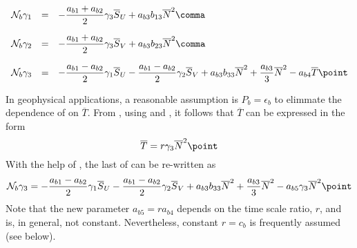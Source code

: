 \begin{equation}
 \label{giVertical}
 \begin{array}{rcl}
  {\cal N}_b \gamma_1
  &=&
  - \dfrac{a_{b1} + a_{b2}}{2}           \gamma_3 \overline{S}_U
  +      a_{b3}                           b_{13}  \overline{N}^2                  
  \comma \\[5mm] 
  {\cal N}_b \gamma_2
  &=&
  - \dfrac{a_{b1} + a_{b2}}{2}           \gamma_3 \overline{S}_V
  +      a_{b3}                           b_{23}  \overline{N}^2                  
  \comma \\[5mm] 
  {\cal N}_b \gamma_3
  &=&
  - \dfrac{a_{b1} - a_{b2}}{2}           \gamma_1 \overline{S}_U
  - \dfrac{a_{b1} - a_{b2}}{2}           \gamma_2 \overline{S}_V
  +         a_{b3}                         b_{33} \overline{N}^2                              
  + \dfrac{a_{b3}}{3}                             \overline{N}^2                              
  -         a_{b4}                                \overline{T}                          
 \point
 \end{array}
\end{equation}

In geophysical applications, a reasonable assumption is
$P_b=\epsilon_b$ to elimmate the dependence of  on
$\overline{T}$. From , using
 and , it follows that $\overline{T}$ can be
expressed in the form
\begin{equation}
 \label{Tequilibrium}
   \overline{T} = r \gamma_3 \overline{N}^2
 \point
\end{equation}
With the help of , the last of  can be
re-written as
\begin{equation}
 \label{giVerticalEq}
  {\cal N}_b \gamma_3
  =
  - \dfrac{a_{b1} - a_{b2}}{2}             \gamma_1 \overline{S}_U
  - \dfrac{a_{b1} - a_{b2}}{2}             \gamma_2 \overline{S}_V
  +        a_{b3}                            b_{33} \overline{N}^2                              
  +     \dfrac{a_{b3}}{3}                           \overline{N}^2                              
  -        a_{b5}                          \gamma_3 \overline{N}^2               
 \point
\end{equation}
Note that the new parameter $a_{b5} = r a_{b4}$ depends on the time
scale ratio, $r$, and is, in general, not constant. Nevertheless,
constant $r=c_b$ is frequently assumed (see below).

